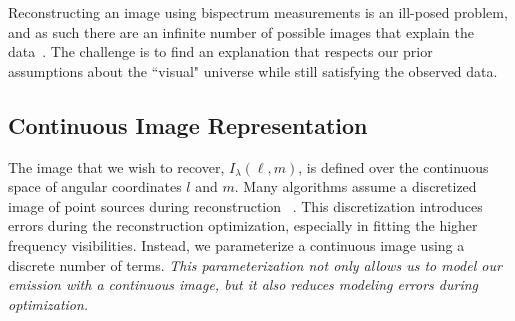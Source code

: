 			
Reconstructing an image using bispectrum measurements is an ill-posed problem, and as such there are an infinite number of possible images that explain the data~\cite{rusenimaging}. 
The challenge is to find an explanation that respects our prior assumptions about the ``visual" universe
while still satisfying the observed data. 




\subsection{Continuous Image Representation}


The image that we wish to recover, $I_{\lambda}(\ell,m)$, is defined over the continuous space of angular coordinates $l$ and $m$. 
Many algorithms assume a discretized image of point sources during reconstruction 
~\cite{taylor1999synthesis}. This discretization introduces errors during the reconstruction optimization, especially in fitting the higher frequency visibilities.
Instead, we parameterize a continuous image using a discrete number of terms. 
{\it This parameterization not only allows us to model our emission with a continuous image, but it also reduces modeling errors during optimization. }

